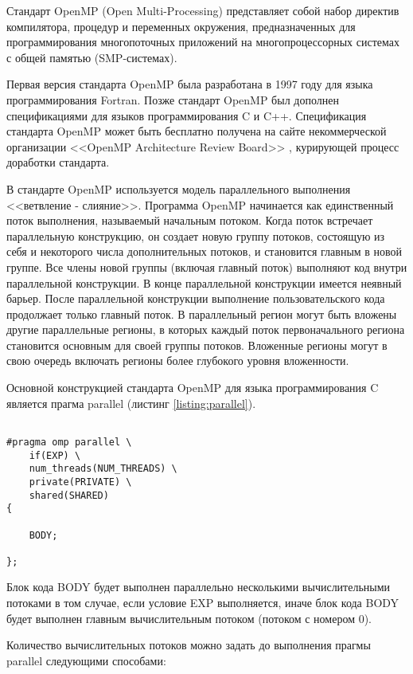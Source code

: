 Стандарт OpenMP (Open Multi-Processing) представляет собой набор директив компилятора, процедур и переменных окружения, предназначенных для программирования многопоточных приложений на многопроцессорных системах с общей памятью (SMP-системах).

Первая версия стандарта OpenMP была разработана в 1997 году для языка программирования Fortran. Позже стандарт OpenMP был дополнен спецификациями для языков программирования C и C++. Спецификация стандарта OpenMP может быть бесплатно получена на сайте некоммерческой организации <<OpenMP Architecture Review Board>> \cite{openmp}, курирующей процесс доработки стандарта.

В стандарте OpenMP используется модель параллельного выполнения <<ветвление - слияние>>. Программа OpenMP начинается как единственный поток выполнения, называемый начальным потоком. Когда поток встречает параллельную конструкцию, он создает новую группу потоков, состоящую из себя и некоторого числа дополнительных потоков, и становится главным в новой группе. Все члены новой группы (включая главный поток) выполняют код внутри параллельной конструкции. В конце параллельной конструкции имеется неявный барьер. После параллельной конструкции выполнение пользовательского кода продолжает только главный поток. В параллельный регион могут быть вложены другие параллельные регионы, в которых каждый поток первоначального региона становится основным для своей группы потоков. Вложенные регионы могут в свою очередь включать регионы более глубокого уровня вложенности.

Основной конструкцией стандарта OpenMP для языка программирования C является прагма parallel (листинг \ref{listing:parallel}).

\begin{lstlisting}

#pragma omp parallel \
	if(EXP) \
	num_threads(NUM_THREADS) \
	private(PRIVATE) \
	shared(SHARED)
{

	BODY;

};

\end{lstlisting}
\mylistingend

Блок кода BODY будет выполнен параллельно несколькими вычислительными потоками в том случае, если условие EXP выполняется, иначе блок кода BODY будет выполнен главным вычислительным потоком (потоком с номером 0).

Количество вычислительных потоков можно задать до выполнения прагмы parallel следующими способами:


